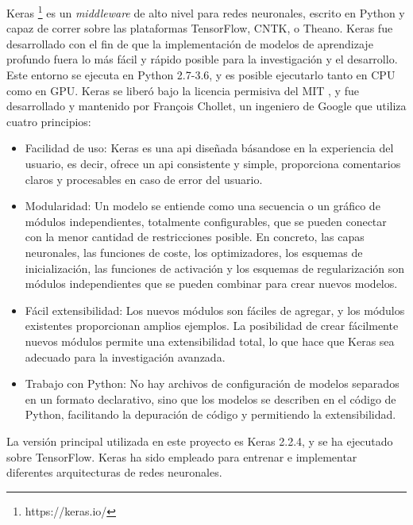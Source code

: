Keras \footnote{https://keras.io/} es un \textit{middleware} de alto nivel para redes neuronales, escrito en Python y capaz de correr sobre las plataformas TensorFlow, CNTK, o Theano. Keras fue desarrollado con el fin de que la implementación de modelos de aprendizaje profundo fuera lo  más fácil y rápido posible para la investigación y el desarrollo.\\

Este entorno se ejecuta en Python 2.7-3.6, y es posible ejecutarlo tanto en CPU como en GPU. Keras se liberó bajo la licencia permisiva del MIT \cite{Keras_license}, y fue desarrollado y mantenido por François Chollet, un ingeniero de Google que utiliza cuatro principios:

\begin{itemize}
        \item Facilidad de uso: Keras es una \acrshort{api} diseñada básandose en la experiencia del usuario, es decir, ofrece un \acrshort{api} consistente y simple, proporciona comentarios claros y procesables en caso de error del usuario.
    
    \item Modularidad: Un modelo se entiende como una secuencia o un gráfico de módulos independientes, totalmente configurables, que se pueden conectar con la menor cantidad de restricciones posible. En concreto, las capas neuronales, las funciones de coste, los optimizadores, los esquemas de inicialización, las funciones de activación y los esquemas de regularización son módulos independientes que se pueden combinar para crear nuevos modelos.
    
    \item Fácil extensibilidad: Los nuevos módulos son fáciles de agregar, y los módulos existentes proporcionan amplios ejemplos. La posibilidad de crear fácilmente nuevos módulos permite una extensibilidad total, lo que hace que Keras sea adecuado para la investigación avanzada.
    
    \item Trabajo con Python: No hay archivos de configuración de modelos separados en un formato declarativo, sino que los modelos se describen en el código de Python, facilitando la depuración de código y permitiendo la extensibilidad.
\end{itemize}

La versión principal utilizada en este proyecto es Keras 2.2.4, y se ha ejecutado sobre TensorFlow. Keras ha sido empleado para entrenar e implementar diferentes arquitecturas de redes neuronales.\\

